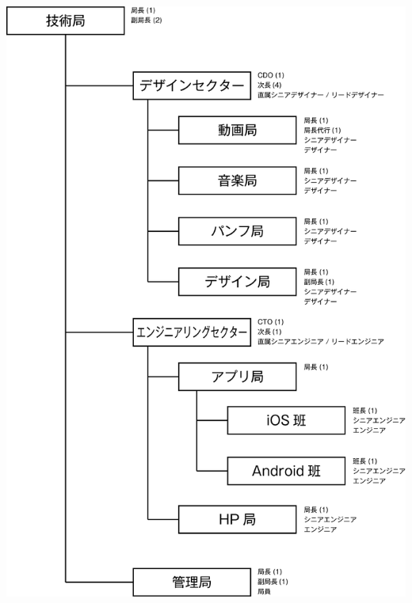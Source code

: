 \documentclass[dvipdfmx,jb5]{jarticle}
\begin{document}
\vspace{5mm}
\includegraphics[scale=0.7]{assets/tech.png}\\
\end{document}
